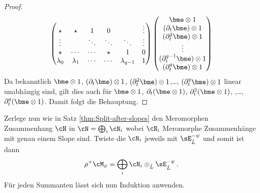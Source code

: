 \begin{proof}
\[\begin{pmatrix}
\star     & \star     & 1      & 0      &               & \vdots\\
\vdots    &           & \ddots & \ddots & \ddots        & \vdots\\
\star     & \cdots    & \cdots & \star  & 1             & 0\\
\lambda_0 & \lambda_1 & \cdots & \cdots & \lambda_{q-1} & 1\\
\end{pmatrix}
\begin{pmatrix}
\bme\otimes 1\\
(\partial_t \bme)\otimes 1\\
(\partial_t^{2}\bme)\otimes 1\\
\vdots\\
(\partial_t^{q-1}\bme)\otimes 1\\
(\partial_t^{q}\bme)\otimes 1\\
\end{pmatrix}
\]
Da bekanntlich $\bme\otimes1$, $(\partial_t \bme)\otimes 1$,
$(\partial_t^{2}\bme)\otimes 1$,\dots, $(\partial_t^{q}\bme)\otimes 1$ linear
unabhängig sind, gilt dies auch für $\bme\otimes 1$, $\partial_t(\bme\otimes
1)$, $\partial_t^2(\bme\otimes 1)$, ,\dots, $\partial_t^{q}(\bme\otimes 1)$.
Damit folgt die Behauptung.
\end{proof}
\begin{comment}
\begin{lem}
\cite[Seite 44]{DiplHedwig}
Wenn $\rho^+\cM_\phi=\cD_{\hat L}/\cD_{\hat
L}\cdot(\rho^*P_{\phi}(t,\partial_t))$ gilt, so ist
\begin{align*}
\cN\bydef\rho^+\cM_\phi\otimes\sE_{\hat L}^\psi
  &=\cD_{\hat L}/\cD_{\hat
    L}\cdot(\rho^*P_{\phi}(t,\partial_t+\frac{\beta}{t^{\lambda+1}}))
\\&=\cD_{\hat L}/\cD_{\hat L}\cdot
    (t^{q+2}(\partial_t+\frac{\beta}{t^{\lambda+1}}))^{q}
    (t(\partial_x+\frac{\beta}{t^{\lambda+1}})-(q+1))+(q+1)qa
\end{align*}
\end{lem}
\end{comment}
Zerlege nun wie in  Satz \ref{thm:Split-after-slopes} den Meromorphen
Zusammenhang $\cN$ in $\cN=\bigoplus_i\cN_i$ wobei $\cN_i$ Meromorphe
Zusammenhänge mit genau einem Slope sind.
Twiste die $\cN_i$ jeweils mit $\sE^{-\psi}_{\hat L}$ und somit ist dann
\[
\rho^+\cM_{\phi}=\bigoplus_i\cN_i\otimes_{\hat L}\sE^{-\psi}_{\hat L} \,.
\]
Für jeden Summanten lässt sich nun Induktion anwenden.

